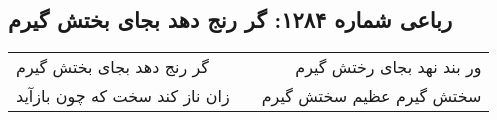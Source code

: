 \begin{center}
\section*{رباعی شماره ۱۲۸۴: گر رنج دهد بجای بختش گیرم}
\label{sec:1284}
\begin{longtable}{l p{0.5cm} r}
گر رنج دهد بجای بختش گیرم
&&
ور بند نهد بجای رختش گیرم
\\
زان ناز کند سخت که چون بازآید
&&
سختش گیرم عظیم سختش گیرم
\\
\end{longtable}
\end{center}
